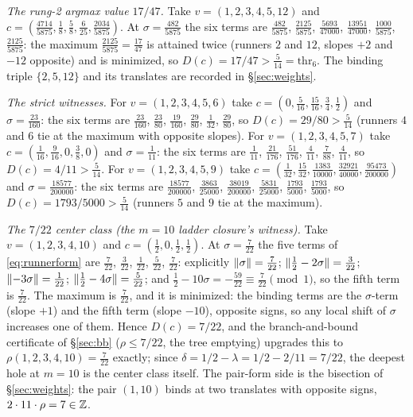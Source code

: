 \emph{The rung-2 argmax value $17/47$.} Take
$v=(1,2,3,4,5,12)$ and
$c=(\tfrac{4714}{5875},\tfrac18,\tfrac58,\tfrac6{25},
\tfrac{2034}{5875})$. At $\sigma=\tfrac{482}{5875}$ the six terms are
$\tfrac{482}{5875}$, $\tfrac{2125}{5875}$, $\tfrac{5693}{47000}$,
$\tfrac{13951}{47000}$, $\tfrac{1000}{5875}$, $\tfrac{2125}{5875}$:
the maximum $\tfrac{2125}{5875}=\tfrac{17}{47}$ is attained twice
(runners $2$ and $12$, slopes $+2$ and $-12$ opposite) and is
minimized, so $D(c)=17/47>\tfrac5{14}=\mathrm{thr}_6$. The binding
triple $\{2,5,12\}$ and its translates are recorded in
\S\ref{sec:weights}.

\emph{The strict witnesses.} For $v=(1,2,3,4,5,6)$ take
$c=(0,\tfrac5{16},\tfrac{15}{16},\tfrac34,\tfrac12)$ and
$\sigma=\tfrac{23}{160}$: the six terms are
$\tfrac{23}{160}$, $\tfrac{23}{80}$, $\tfrac{19}{160}$, $\tfrac{29}{80}$,
$\tfrac1{32}$, $\tfrac{29}{80}$, so $D(c)=29/80>\tfrac5{14}$ (runners
$4$ and $6$ tie at the maximum with opposite slopes). For
$v=(1,2,3,4,5,7)$ take
$c=(\tfrac1{16},\tfrac9{16},0,\tfrac38,0)$ and $\sigma=\tfrac1{11}$:
the six terms are $\tfrac1{11}$, $\tfrac{21}{176}$, $\tfrac{51}{176}$,
$\tfrac4{11}$, $\tfrac7{88}$, $\tfrac4{11}$, so $D(c)=4/11>
\tfrac5{14}$. For $v=(1,2,3,4,5,9)$ take
$c=(\tfrac1{32},\tfrac{15}{32},\tfrac{1383}{10000},
\tfrac{32921}{40000},\tfrac{95473}{200000})$ and
$\sigma=\tfrac{18577}{200000}$: the six terms are
$\tfrac{18577}{200000}$, $\tfrac{3863}{25000}$,
$\tfrac{38019}{200000}$, $\tfrac{5831}{25000}$, $\tfrac{1793}{5000}$,
$\tfrac{1793}{5000}$, so $D(c)=1793/5000>\tfrac5{14}$ (runners $5$ and
$9$ tie at the maximum).

\emph{The $7/22$ center class (the $m=10$ ladder closure's witness).}
Take $v=(1,2,3,4,10)$ and
$c=(\tfrac12,0,\tfrac12,\tfrac12)$. At $\sigma=\tfrac{7}{22}$ the five
terms of \eqref{eq:runnerform} are $\tfrac{7}{22}$, $\tfrac{3}{22}$,
$\tfrac{1}{22}$, $\tfrac{5}{22}$, $\tfrac{7}{22}$: explicitly
$\lVert \sigma \rVert=\tfrac7{22}$; $\lVert \tfrac12-2\sigma \rVert=\tfrac3{22}$;
$\lVert -3\sigma \rVert=\tfrac1{22}$;
$\lVert \tfrac12-4\sigma \rVert=\tfrac5{22}$; and
$\tfrac12-10\sigma=-\tfrac{59}{22}\equiv\tfrac7{22}\pmod 1$, so the
fifth term is $\tfrac7{22}$. The maximum is $\tfrac7{22}$, and it is
minimized: the binding terms are the $\sigma$-term (slope $+1$) and the
fifth term (slope $-10$), opposite signs, so any local shift of
$\sigma$ increases one of them. Hence $D(c)=7/22$, and the
branch-and-bound certificate of \S\ref{sec:bb} ($\rho\le7/22$, the
tree emptying) upgrades this to $\rho(1,2,3,4,10)=\tfrac{7}{22}$
exactly; since $\delta=1/2-\lambda=1/2-2/11=7/22$, the deepest hole at
$m=10$ is the center class itself. The pair-form side is the bisection
of \S\ref{sec:weights}: the pair $(1,10)$ binds at two translates with
opposite signs, $2\cdot 11\cdot\rho=7\in\mathbb{Z}$.

